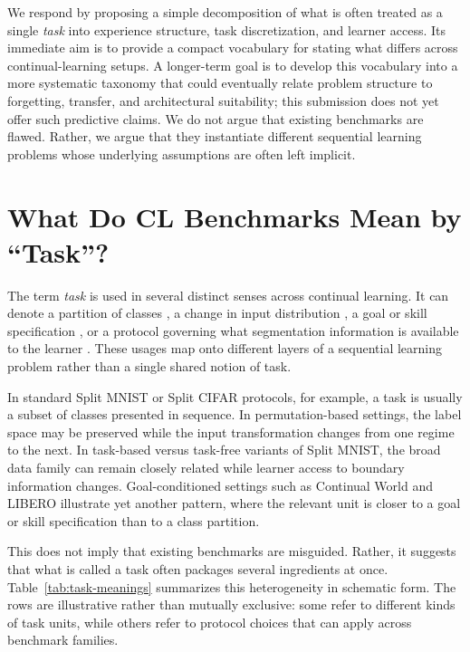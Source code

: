 \documentclass{article} %
\begin{document}
We respond by proposing a simple decomposition of what is often treated as a single \emph{task} into experience structure, task discretization, and learner access. Its immediate aim is to provide a compact vocabulary for stating what differs across continual-learning setups. A longer-term goal is to develop this vocabulary into a more systematic taxonomy that could eventually relate problem structure to forgetting, transfer, and architectural suitability; this submission does not yet offer such predictive claims. We do not argue that existing benchmarks are flawed. Rather, we argue that they instantiate different sequential learning problems whose underlying assumptions are often left implicit.

\section{What Do CL Benchmarks Mean by ``Task''?}
The term \emph{task} is used in several distinct senses across continual learning. It can denote a partition of classes \citep{van2022three,goodfellow2013empirical,rebuffi2017icarl}, a change in input distribution \citep{goodfellow2013empirical}, a goal or skill specification \citep{wolczyk2021continual,liu2023libero}, or a protocol governing what segmentation information is available to the learner \citep{van_de_Ven_2025}. These usages map onto different layers of a sequential learning problem rather than a single shared notion of task.

In standard Split MNIST or Split CIFAR protocols, for example, a task is usually a subset of classes presented in sequence. In permutation-based settings, the label space may be preserved while the input transformation changes from one regime to the next. In task-based versus task-free variants of Split MNIST, the broad data family can remain closely related while learner access to boundary information changes. Goal-conditioned settings such as Continual World and LIBERO illustrate yet another pattern, where the relevant unit is closer to a goal or skill specification than to a class partition.

This does not imply that existing benchmarks are misguided. Rather, it suggests that what is called a task often packages several ingredients at once. Table~\ref{tab:task-meanings} summarizes this heterogeneity in schematic form. The rows are illustrative rather than mutually exclusive: some refer to different kinds of task units, while others refer to protocol choices that can apply across benchmark families.
\end{document}
